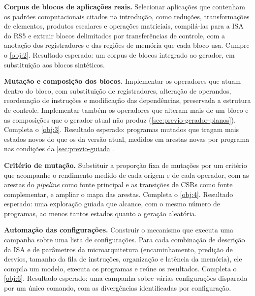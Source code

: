 \begin{atividades}
    \item \label{atv:corpus} \textbf{Corpus de blocos de aplicações reais.} Selecionar aplicações que contenham os padrões computacionais citados na introdução, como reduções, transformações de elementos, produtos escalares e operações matriciais, compilá-las para a ISA do RS5 e extrair blocos delimitados por transferências de controle, com a anotação dos registradores e das regiões de memória que cada bloco usa. Cumpre o \cref{obj:2}. Resultado esperado: um corpus de blocos integrado ao gerador, em substituição aos blocos sintéticos.

    \item \label{atv:mutacao} \textbf{Mutação e composição dos blocos.} Implementar os operadores que atuam dentro do bloco, com substituição de registradores, alteração de operandos, reordenação de instruções e modificação das dependências, preservada a estrutura de controle. Implementar também os operadores que alteram mais de um bloco e as composições que o gerador atual não produz (\cref{sec:previo-gerador-planos}). Completa o \cref{obj:3}. Resultado esperado: programas mutados que tragam mais estados novos do que os da versão atual, medidos em arestas novas por programa nas condições da \cref{sec:previo-guiada}.

    \item \label{atv:criterio} \textbf{Critério de mutação.} Substituir a proporção fixa de mutações por um critério que acompanhe o rendimento medido de cada origem e de cada operador, com as arestas do \textit{pipeline} como fonte principal e as transições de CSRs como fonte complementar, e ampliar o mapa das arestas. Completa o \cref{obj:4}. Resultado esperado: uma exploração guiada que alcance, com o mesmo número de programas, ao menos tantos estados quanto a geração aleatória.

    \item \label{atv:config} \textbf{Automação das configurações.} Construir o mecanismo que executa uma campanha sobre uma lista de configurações. Para cada combinação de descrição da ISA e de parâmetros da microarquitetura (encaminhamento, predição de desvios, tamanho da fila de instruções, organização e latência da memória), ele compila um modelo, executa os programas e reúne os resultados. Completa o \cref{obj:6}. Resultado esperado: uma campanha sobre várias configurações disparada por um único comando, com as divergências identificadas por configuração.


\end{atividades}
